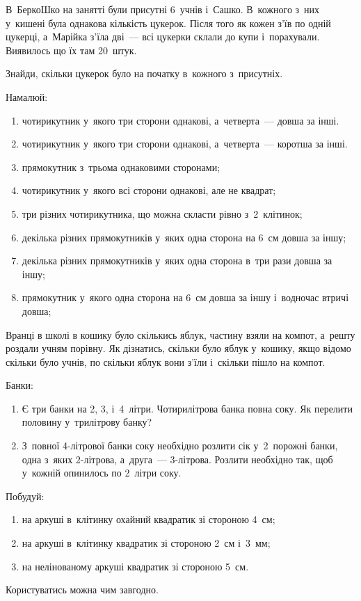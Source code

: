 \problem
В~БеркоШко на занятті були присутні 6~учнів і~Сашко.
В~кожного з~них у~кишені була однакова кількість цукерок.
Після того як кожен з'їв по одній цукерці,
а~Марійка з'їла дві~--- всі цукерки склали до купи і~порахували.
Виявилось що їх там 20~штук.

Знайди, скільки цукерок було на початку в~кожного з~присутніх.


\problem
Намалюй:
\begin{enumerate}
    \item чотирикутник у~якого три сторони однакові,
    а~четверта~--- довша за інші.
    \item чотирикутник у~якого три сторони однакові,
    а~четверта~--- коротша за інші.
    \item прямокутник з~трьома однаковими сторонами;
    \item чотирикутник у~якого всі сторони однакові, але не квадрат;
    \item три різних чотирикутника, що можна скласти рівно з~2~клітинок;
    \item декілька різних прямокутників у~яких одна сторона
    на 6~см довша за іншу;
    \item декілька різних прямокутників у~яких одна сторона
    в~три рази довша за іншу;
    \item прямокутник у~якого одна сторона на 6~см довша за іншу
    і~водночас втричі довша;
\end{enumerate}


\problem
Вранці в школі в кошику було скількись яблук, частину взяли на компот,
а~решту роздали учням порівну.
Як дізнатись, скільки було яблук у~кошику, якщо відомо скільки було учнів,
по скільки яблук вони з'їли і~скільки пішло на компот.


\problem
Банки:
\begin{enumerate}
    \item Є три банки на 2, 3, і~4~літри. Чотирилітрова банка повна соку.
    Як перелити половину у~трилітрову банку?
    \item З~повної 4-літрової банки соку необхідно розлити сік 
    у~2~порожні банки, одна з~яких 2-літрова, а~друга~--- 3-літрова.
    Розлити необхідно так, щоб у~кожній опинилось по 2~літри соку.
\end{enumerate}


\problem
Побудуй:
\begin{enumerate}
    \item на аркуші в~клітинку охайний квадратик зі стороною 4~см;
    \item на аркуші в~клітинку квадратик зі стороною 2~см і~3~мм;
    \item на нелінованому аркуші квадратик зі стороною 5~см.
\end{enumerate}
Користуватись можна чим завгодно.


